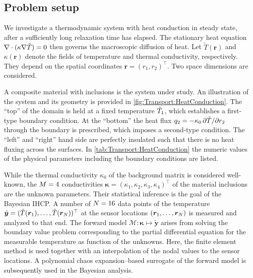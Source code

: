 \subsection{Problem setup}
We investigate a thermodynamic system with heat conduction in steady state, after a sufficiently long relaxation time has elapsed.
The stationary heat equation \(\nabla \cdot (\kappa \nabla \tilde{T}) = 0\) then governs the macroscopic diffusion of heat.
Let \(\tilde{T}(\bm{r})\) and \(\kappa(\bm{r})\) denote the fields of temperature and thermal conductivity, respectively.
They depend on the spatial coordinates \(\bm{r} = (r_1,r_2)^\top\).
Two space dimensions are considered.
\par %
A composite material with inclusions is the system under study.
An illustration of the system and its geometry is provided in \cref{fig:Transport:HeatConduction}.
The ``top'' of the domain is held at a fixed temperature \(\tilde{T}_1\), which establishes a first-type boundary condition.
At the ``bottom'' the heat flux \(q_2 = - \kappa_0 \, \partial \tilde{T} / \partial r_2\) through the boundary is prescribed, which imposes a second-type condition.
The ``left'' and ``right'' hand side are perfectly insulated such that there is no heat fluxing across the surfaces.
In \cref{tab:Transport:HeatConduction} the numeric values of the physical parameters including the boundary conditions are listed.
\par %
While the thermal conductivity \(\kappa_0\) of the background matrix is considered well-known,
the \(M = 4\) conductivities \(\bm{\kappa} = (\kappa_1,\kappa_2,\kappa_3,\kappa_4)^\top\) of the material inclusions are the unknown parameters.
Their statistical inference is the goal of the Bayesian IHCP.
A number of \(N = 16\) data points of the temperature \(\tilde{\bm{y}} = (\tilde{T}(\bm{r}_1),\ldots,\tilde{T}(\bm{r}_N))^\top\)
at the sensor locations \((\bm{r}_1,\ldots,\bm{r}_N)\) is measured and analyzed to that end.
The forward model \(\mathcal{M} \colon \bm{\kappa} \mapsto \tilde{\bm{y}}\) arises from solving the boundary value problem
corresponding to the partial differential equation for the measurable temperature as function of the unknowns.
Here, the finite element method is used together with an interpolation of the nodal values to the sensor locations.
A polynomial chaos expansion--based surrogate of the forward model is subsequently used in the Bayesian analysis.
